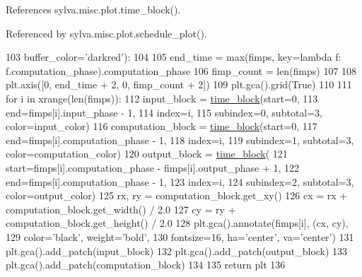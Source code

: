 References sylva.\+misc.\+plot.\+time\+\_\+block().



Referenced by sylva.\+misc.\+plot.\+schedule\+\_\+plot().


\begin{DoxyCode}
103                                   buffer\_color=\textcolor{stringliteral}{'darkred'}):
104 
105         end\_time = max(fimps, key=\textcolor{keyword}{lambda} f: f.computation\_phase).computation\_phase
106         fimp\_count = len(fimps)
107 
108         plt.axis([0, end\_time + 2, 0, fimp\_count + 2])
109         plt.gca().grid(\textcolor{keyword}{True})
110 
111         \textcolor{keywordflow}{for} i \textcolor{keywordflow}{in} xrange(len(fimps)):
112             input\_block = \hyperlink{namespacesylva_1_1misc_1_1plot_a39ec0e33c0b551cbb7d10d42e63bfa3d}{time\_block}(start=0,
113                                      end=fimps[i].input\_phase - 1,
114                                      index=i,
115                                      subindex=0, subtotal=3, color=input\_color)
116             computation\_block = \hyperlink{namespacesylva_1_1misc_1_1plot_a39ec0e33c0b551cbb7d10d42e63bfa3d}{time\_block}(start=0,
117                                            end=fimps[i].computation\_phase - 1,
118                                            index=i,
119                                            subindex=1, subtotal=3, color=computation\_color)
120             output\_block = \hyperlink{namespacesylva_1_1misc_1_1plot_a39ec0e33c0b551cbb7d10d42e63bfa3d}{time\_block}(
121                 start=fimps[i].computation\_phase - fimps[i].output\_phase + 1,
122                 end=fimps[i].computation\_phase - 1,
123                 index=i,
124                 subindex=2, subtotal=3, color=output\_color)
125             rx, ry = computation\_block.get\_xy()
126             cx = rx + computation\_block.get\_width() / 2.0
127             cy = ry + computation\_block.get\_height() / 2.0
128             plt.gca().annotate(fimps[i], (cx, cy),
129                                color=\textcolor{stringliteral}{'black'}, weight=\textcolor{stringliteral}{'bold'},
130                                fontsize=16, ha=\textcolor{stringliteral}{'center'}, va=\textcolor{stringliteral}{'center'})
131             plt.gca().add\_patch(input\_block)
132             plt.gca().add\_patch(output\_block)
133             plt.gca().add\_patch(computation\_block)
134 
135         \textcolor{keywordflow}{return} plt
136 
\end{DoxyCode}
\mbox{\label{namespacesylva_1_1misc_1_1plot_a407cb01fd5820f94e98a438d04391c6e}} 
